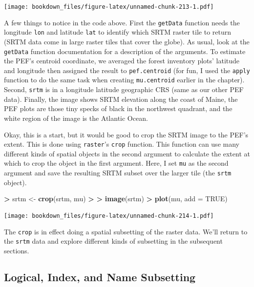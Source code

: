 \documentclass[]{krantz}
\makeatletter
\newenvironment{Shaded}{\begin{snugshade}}{\end{snugshade}}
\newcommand{\KeywordTok}[1]{\textcolor[rgb]{0.27,0.27,0.27}{\textbf{#1}}}
\newcommand{\DataTypeTok}[1]{\textcolor[rgb]{0.27,0.27,0.27}{#1}}
\newcommand{\StringTok}[1]{\textcolor[rgb]{0.5,0.5,0.5}{#1}}
\newcommand{\OtherTok}[1]{\textcolor[rgb]{0.37,0.37,0.37}{#1}}
\newcommand{\OperatorTok}[1]{\textcolor[rgb]{0.43,0.43,0.43}{\textbf{#1}}}
\newcommand{\ErrorTok}[1]{\textcolor[rgb]{0.14,0.14,0.14}{\textbf{#1}}}
\newcommand{\NormalTok}[1]{#1}
\newenvironment{kframe}{%
\medskip{}
\setlength{\fboxsep}{.8em}
 \def\at@end@of@kframe{}%
 \ifinner\ifhmode%
  \def\at@end@of@kframe{\end{minipage}}%
  \begin{minipage}{\columnwidth}%
 \fi\fi%
 \def\FrameCommand##1{\hskip\@totalleftmargin \hskip-\fboxsep
 \colorbox{shadecolor}{##1}\hskip-\fboxsep
     \hskip-\linewidth \hskip-\@totalleftmargin \hskip\columnwidth}%
 \MakeFramed {\advance\hsize-\width
   \@totalleftmargin\z@ \linewidth\hsize
   \@setminipage}}%
 {\par\unskip\endMakeFramed%
 \at@end@of@kframe}
\renewenvironment{Shaded}{\begin{kframe}}{\end{kframe}}
\makeatother
\begin{document}
\texttt{[image: bookdown\_files/figure-latex/unnamed-chunk-213-1.pdf]}

A few things to notice in the code above. First the \texttt{getData}
function needs the longitude \texttt{lon} and latitude \texttt{lat} to
identify which SRTM raster tile to return (SRTM data come in large
raster tiles that cover the globe). As usual, look at the
\texttt{getData} function documentation for a description of the
arguments. To estimate the PEF's centroid coordinate, we averaged the
forest inventory plots' latitude and longitude then assigned the result
to \texttt{pef.centroid} (for fun, I used the \texttt{apply} function to
do the same task when creating \texttt{mu.centroid} earlier in the
chapter). Second, \texttt{srtm} is in a longitude latitude geographic
CRS (same as our other PEF data). Finally, the image shows SRTM
elevation along the coast of Maine, the PEF plots are those tiny specks
of black in the northwest quadrant, and the white region of the image is
the Atlantic Ocean.

Okay, this is a start, but it would be good to crop the SRTM image to
the PEF's extent. This is done using \texttt{raster}'s \texttt{crop}
function. This function can use many different kinds of spatial objects
in the second argument to calculate the extent at which to crop the
object in the first argument. Here, I set \texttt{mu} as the second
argument and save the resulting SRTM subset over the larger tile (the
\texttt{srtm} object).

\begin{Shaded}
\begin{Highlighting}[]
\OperatorTok{>}\StringTok{ }\NormalTok{srtm <-}\StringTok{ }\KeywordTok{crop}\NormalTok{(srtm, mu)}
\OperatorTok{>}\StringTok{ }
\ErrorTok{>}\StringTok{ }\KeywordTok{image}\NormalTok{(srtm)}
\OperatorTok{>}\StringTok{ }\KeywordTok{plot}\NormalTok{(mu, }\DataTypeTok{add =} \OtherTok{TRUE}\NormalTok{)}
\end{Highlighting}
\end{Shaded}

\texttt{[image: bookdown\_files/figure-latex/unnamed-chunk-214-1.pdf]}

The \texttt{crop} is in effect doing a spatial subsetting of the raster
data. We'll return to the \texttt{srtm} data and explore different kinds
of subsetting in the subsequent sections.

\subsection{Logical, Index, and Name
Subsetting}\label{logical-index-and-name-subsetting}
\end{document}

